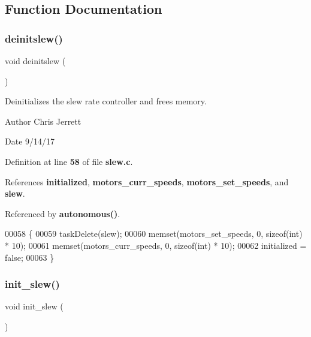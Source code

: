\subsection{Function Documentation}
\mbox{\label{slew_8c_a981c9990a969d2587e66e550737f7cd9}} 
\subsubsection{deinitslew()}
{\footnotesize\ttfamily void deinitslew (\begin{DoxyParamCaption}{ }\end{DoxyParamCaption})}



Deinitializes the slew rate controller and frees memory. 

\begin{DoxyAuthor}{Author}
Chris Jerrett 
\end{DoxyAuthor}
\begin{DoxyDate}{Date}
9/14/17 
\end{DoxyDate}


Definition at line \textbf{ 58} of file \textbf{ slew.\+c}.



References \textbf{ initialized}, \textbf{ motors\+\_\+curr\+\_\+speeds}, \textbf{ motors\+\_\+set\+\_\+speeds}, and \textbf{ slew}.



Referenced by \textbf{ autonomous()}.


\begin{DoxyCode}
00058                  \{
00059   taskDelete(slew);
00060   memset(motors_set_speeds, 0, \textcolor{keyword}{sizeof}(\textcolor{keywordtype}{int}) * 10);
00061   memset(motors_curr_speeds, 0, \textcolor{keyword}{sizeof}(\textcolor{keywordtype}{int}) * 10);
00062   initialized = \textcolor{keyword}{false};
00063 \}
\end{DoxyCode}
\mbox{\label{slew_8c_a321758941d88b75783955c819bb75005}} 
\subsubsection{init\+\_\+slew()}
{\footnotesize\ttfamily void init\+\_\+slew (\begin{DoxyParamCaption}{ }\end{DoxyParamCaption})}




